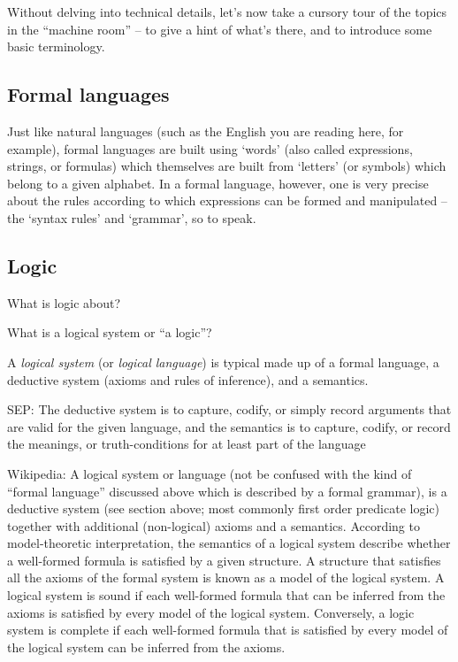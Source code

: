 Without delving into technical details, let's now take a cursory tour of the topics in the ``machine room'' -- to give a hint of what's there, and to introduce some basic terminology.

\subsection{Formal languages}

Just like natural languages (such as the English you are reading here, for example), formal languages are built using `words' (also called expressions, strings, or formulas) which themselves are built from `letters' (or symbols) which belong to a given alphabet.
In a formal language, however, one is very precise about the rules according to which expressions can be formed and manipulated -- the `syntax rules' and `grammar', so to speak.


\subsection{Logic}

What is logic about?

What is a logical system or ``a logic''?

A \emph{logical system} (or \emph{logical language}) is typical made up of a formal language, a deductive system (axioms and rules of inference), and a semantics.

SEP: The deductive system is to capture, codify, or simply record arguments that are valid for the given language, and the semantics is to capture, codify, or record the meanings, or truth-conditions for at least part of the language

Wikipedia: A logical system or language (not be confused with the kind of ``formal language'' discussed above which is described by a formal grammar), is a deductive system (see section above; most commonly first order predicate logic) together with additional (non-logical) axioms and a semantics.
According to model-theoretic interpretation, the semantics of a logical system describe whether a well-formed formula is satisfied by a given structure.
A structure that satisfies all the axioms of the formal system is known as a model of the logical system.
A logical system is sound if each well-formed formula that can be inferred from the axioms is satisfied by every model of the logical system.
Conversely, a logic system is complete if each well-formed formula that is satisfied by every model of the logical system can be inferred from the axioms.

